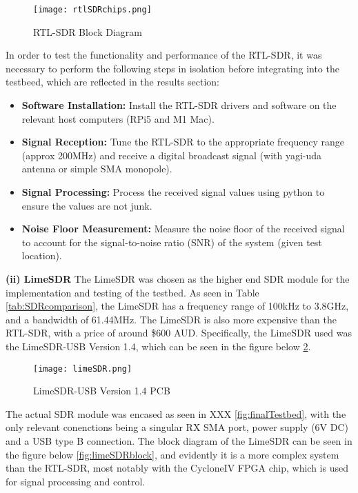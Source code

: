 \begin{figure}[htbp]
    \centering
    \texttt{[image: rtlSDRchips.png]}
    \caption{RTL-SDR Block Diagram \cite{RTLsdrBlockDiagram}}
    \label{fig:rtlSDRblock}
\end{figure}

\par \noindent

In order to test the functionality and performance of the RTL-SDR, it was necessary to perform the following steps in isolation before integrating into the testbeed, which are reflected in the results section:
\begin{itemize}
    \item \textbf{Software Installation:} Install the RTL-SDR drivers and software on the relevant host computers (RPi5 and M1 Mac).
    \item \textbf{Signal Reception:} Tune the RTL-SDR to the appropriate frequency range (approx 200MHz) and receive a digital broadcast signal (with yagi-uda antenna or simple SMA monopole).
    \item \textbf{Signal Processing:} Process the received signal values using python to ensure the values are not junk.
    \item \textbf{Noise Floor Measurement:} Measure the noise floor of the received signal to account for the signal-to-noise ratio (SNR) of the system (given test location).
\end{itemize}

\vspace{0.5cm} \noindent 
\textbf{(ii) LimeSDR}
The LimeSDR was chosen as the higher end SDR module for the implementation and testing of the testbed. As seen in Table \ref{tab:SDRcomparison}, the LimeSDR has a frequency range of 100kHz to 3.8GHz, and a bandwidth of 61.44MHz. The LimeSDR is also more expensive than the RTL-SDR, with a price of around \$600 AUD. Specifically, the LimeSDR used was the LimeSDR-USB Version 1.4, which can be seen in the figure below \ref{fig:limeSDR}. 

\begin{figure}[htbp]
    \centering
    \texttt{[image: limeSDR.png]}
    \caption{LimeSDR-USB Version 1.4 PCB \cite{limesdr_usb}}
    \label{fig:limeSDR}
\end{figure}

The actual SDR module was encased as seen in XXX \ref{fig:finalTestbed}, with the only relevant conenctions being a singular RX SMA port, power supply (6V DC) and a USB type B connection. The block diagram of the LimeSDR can be seen in the figure below \ref{fig:limeSDRblock}, and evidently it is a more complex system than the RTL-SDR, most notably with the CycloneIV FPGA chip, which is used for signal processing and control.

